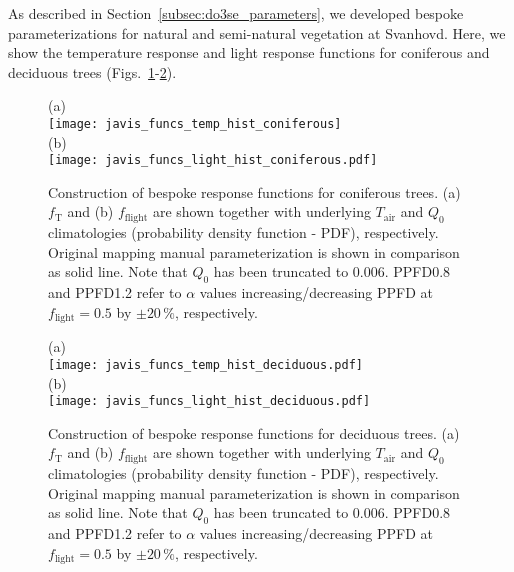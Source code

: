 \documentclass[bg, manuscript]{copernicus}
\begin{document}
As described in Section~\ref{subsec:do3se_parameters}, we developed bespoke parameterizations for natural and semi-natural vegetation at Svanhovd. Here, we show the temperature response and light response functions for coniferous and deciduous trees (Figs.~\ref{fig:f_temp_spruce}-\ref{fig:f_temp_birch}). 

\begin{figure}[t]
  \centering
  (a)\\
  \texttt{[image: javis\_funcs\_temp\_hist\_coniferous]}\\
  (b)\\
  \texttt{[image: javis\_funcs\_light\_hist\_coniferous.pdf]}
\caption{Construction of bespoke response functions for coniferous trees. (a) $f_\mathrm{T}$ and (b) $f_\mathrm{flight}$ are shown together with underlying $T_\mathrm{air}$ and $Q_0$ climatologies (probability density function - PDF), respectively. Original mapping manual parameterization is shown in comparison as solid line. Note that $Q_0$ has been truncated to $0.006$. PPFD0.8 and PPFD1.2 refer to $\alpha$ values increasing/decreasing PPFD at $f_\mathrm{light}=0.5$ by $\pm 20\,\%$, respectively.}
\label{fig:f_temp_spruce}
\end{figure}

\begin{figure}[t]
  \centering
  (a)\\
  \texttt{[image: javis\_funcs\_temp\_hist\_deciduous.pdf]}\\
  (b)\\
  \texttt{[image: javis\_funcs\_light\_hist\_deciduous.pdf]}
\caption{Construction of bespoke response functions for deciduous trees. (a) $f_\mathrm{T}$ and (b) $f_\mathrm{flight}$ are shown together with underlying $T_\mathrm{air}$ and $Q_0$ climatologies (probability density function - PDF), respectively. Original mapping manual parameterization is shown in comparison as solid line. Note that $Q_0$ has been truncated to $0.006$. PPFD0.8 and PPFD1.2 refer to $\alpha$ values increasing/decreasing PPFD at $f_\mathrm{light}=0.5$ by $\pm 20\,\%$, respectively.}
\label{fig:f_temp_birch}
\end{figure}

\clearpage

\noappendix       %
\end{document}
